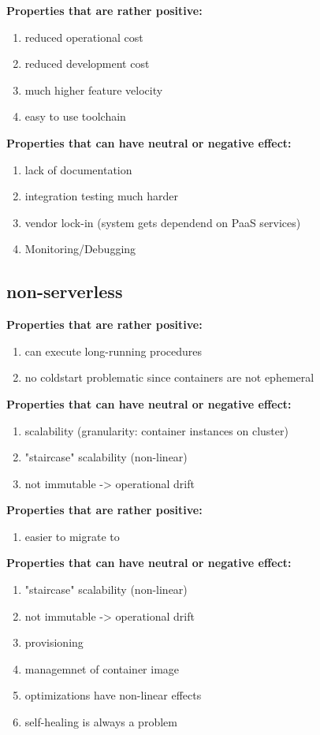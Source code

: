 \textbf{Properties that are rather positive:}
\begin{enumerate}
    \item reduced operational cost
    \item reduced development cost
    \item much higher feature velocity
    \item easy to use toolchain
\end{enumerate}

\textbf{Properties that can have neutral or negative effect:}
\begin{enumerate}
    \item lack of documentation
    \item integration testing much harder
    \item vendor lock-in (system gets dependend on PaaS services)
    \item Monitoring/Debugging
\end{enumerate}



\subsection{non-serverless}


\textbf{Properties that are rather positive:}
\begin{enumerate}
    \item can execute long-running procedures
    \item no coldstart problematic since containers are not ephemeral
\end{enumerate}

\textbf{Properties that can have neutral or negative effect:}
\begin{enumerate}
    \item scalability (granularity: container instances on cluster)
    \item "staircase" scalability (non-linear)
    \item not immutable -> operational drift
\end{enumerate}



\textbf{Properties that are rather positive:}
\begin{enumerate}
    \item easier to migrate to
\end{enumerate}

\textbf{Properties that can have neutral or negative effect:}
\begin{enumerate}
    \item "staircase" scalability (non-linear)
    \item not immutable -> operational drift
    \item provisioning
    \item managemnet of container image
    \item optimizations have non-linear effects
    \item self-healing is always a problem
\end{enumerate}
